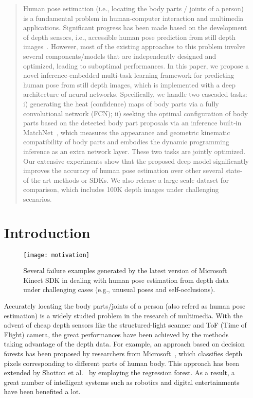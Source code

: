 \documentclass{sig-alternate-05-2015}
\begin{document}
\maketitle
\begin{abstract}
Human pose estimation (i.e., locating the body parts / joints of a person) is a fundamental problem in human-computer interaction and multimedia applications. Significant progress has been made based on the development of depth sensors, i.e., accessible human pose prediction from still depth images~\cite{rf12pami}. However, most of the existing approaches to this problem involve several components/models that are independently designed and optimized, leading to suboptimal performances. In this paper, we propose a novel inference-embedded multi-task learning framework for predicting human pose from still depth images, which is implemented with a deep architecture of neural networks. Specifically, we handle two cascaded tasks: i) generating the heat (confidence) maps of body parts via a fully convolutional network (FCN); ii) seeking the optimal configuration of body parts based on the detected body part proposals via an inference built-in MatchNet~\cite{mn15cvpr}, which measures the appearance and geometric kinematic compatibility of body parts and embodies the dynamic programming inference as an extra network layer. These two tasks are jointly optimized. Our extensive experiments show that the proposed deep model significantly improves the accuracy of human pose estimation over other several state-of-the-art methods or SDKs. We also release a large-scale dataset for comparison, which includes 100K depth images under challenging scenarios.
\end{abstract}




\section{Introduction}
\begin{figure}[!htb]
\centering
\texttt{[image: motivation]}
\caption{Several failure examples generated by the latest version of Microsoft Kinect SDK in dealing with human pose estimation from depth data under challenging cases (e.g., unusual poses and self-occlusions).}\label{fig:motivation}
\end{figure}

Accurately locating the body parts/joints of a person (also referd as human pose estimation) is a widely studied problem in the research of multimedia. With the advent of cheap depth sensors like the structured-light scanner and ToF (Time of Flight) camera, the great performances have been achieved by the methods taking advantage of the depth data. For example, an approach based on decision forests has been proposed by researchers from Microsoft~\cite{rf11cvpr}, which classifies depth pixels corresponding to different parts of human body. This approach has been extended by Shotton et al.~\cite{rf12pami} by employing the regression forest. As a result, a great number of intelligent systems such as robotics and digital entertainments have been benefited a lot.
\end{document}
